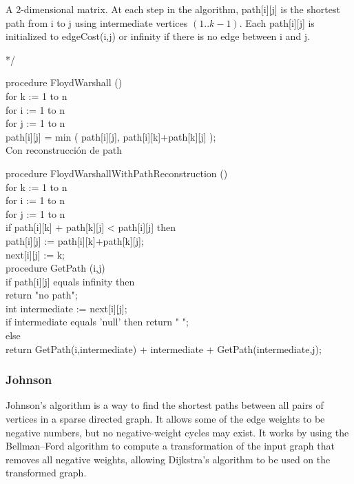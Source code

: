 \documentclass[10pt,letterpaper,twocolumn,twosided]{article}
\begin{document}
    A 2-dimensional matrix. At each step in the algorithm, path[i][j] is the shortest path
    from i to j using intermediate vertices $(1 .. k - 1)$.  Each path[i][j] is initialized to
    edgeCost(i,j) or infinity if there is no edge between i and j.

 */

 procedure FloydWarshall ()\\
    for k := 1 to n\\
       for i := 1 to n\\
          for j := 1 to n\\
             path[i][j] = min ( path[i][j], path[i][k]+path[k][j] );\\

Con reconstrucción de path

procedure FloydWarshallWithPathReconstruction ()\\
    for k := 1 to n\\
       for i := 1 to n\\
          for j := 1 to n\\
             if path[i][k] + path[k][j] < path[i][j] then\\
                path[i][j] := path[i][k]+path[k][j];\\
                next[i][j] := k;\\

 procedure GetPath (i,j)\\
    if path[i][j] equals infinity then\\
      return "no path";\\
    int intermediate := next[i][j];\\
    if intermediate equals 'null' then
      return " "; \\
   else\\
      return GetPath(i,intermediate) + intermediate + GetPath(intermediate,j);\\
      


\subsubsection{Johnson}

Johnson's algorithm is a way to find the shortest paths between all pairs of vertices in a
sparse directed graph. It allows some of the edge weights to be negative numbers, but no 
negative-weight cycles may exist. It works by using the Bellman–Ford algorithm to compute a
transformation of the input graph that removes all negative weights, allowing Dijkstra's algorithm 
to be used on the transformed graph.\\
\end{document}
